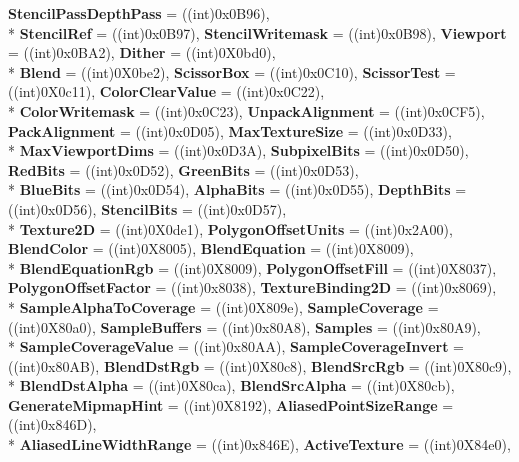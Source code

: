 \begin{DoxyCompactItemize}
{\bfseries Stencil\-Pass\-Depth\-Pass} = ((int)0x0\-B96), 
\\*
{\bfseries Stencil\-Ref} = ((int)0x0\-B97), 
{\bfseries Stencil\-Writemask} = ((int)0x0\-B98), 
{\bfseries Viewport} = ((int)0x0\-B\-A2), 
{\bfseries Dither} = ((int)0\-X0bd0), 
\\*
{\bfseries Blend} = ((int)0\-X0be2), 
{\bfseries Scissor\-Box} = ((int)0x0\-C10), 
{\bfseries Scissor\-Test} = ((int)0\-X0c11), 
{\bfseries Color\-Clear\-Value} = ((int)0x0\-C22), 
\\*
{\bfseries Color\-Writemask} = ((int)0x0\-C23), 
{\bfseries Unpack\-Alignment} = ((int)0x0\-C\-F5), 
{\bfseries Pack\-Alignment} = ((int)0x0\-D05), 
{\bfseries Max\-Texture\-Size} = ((int)0x0\-D33), 
\\*
{\bfseries Max\-Viewport\-Dims} = ((int)0x0\-D3\-A), 
{\bfseries Subpixel\-Bits} = ((int)0x0\-D50), 
{\bfseries Red\-Bits} = ((int)0x0\-D52), 
{\bfseries Green\-Bits} = ((int)0x0\-D53), 
\\*
{\bfseries Blue\-Bits} = ((int)0x0\-D54), 
{\bfseries Alpha\-Bits} = ((int)0x0\-D55), 
{\bfseries Depth\-Bits} = ((int)0x0\-D56), 
{\bfseries Stencil\-Bits} = ((int)0x0\-D57), 
\\*
{\bfseries Texture2\-D} = ((int)0\-X0de1), 
{\bfseries Polygon\-Offset\-Units} = ((int)0x2\-A00), 
{\bfseries Blend\-Color} = ((int)0\-X8005), 
{\bfseries Blend\-Equation} = ((int)0\-X8009), 
\\*
{\bfseries Blend\-Equation\-Rgb} = ((int)0\-X8009), 
{\bfseries Polygon\-Offset\-Fill} = ((int)0\-X8037), 
{\bfseries Polygon\-Offset\-Factor} = ((int)0x8038), 
{\bfseries Texture\-Binding2\-D} = ((int)0x8069), 
\\*
{\bfseries Sample\-Alpha\-To\-Coverage} = ((int)0\-X809e), 
{\bfseries Sample\-Coverage} = ((int)0\-X80a0), 
{\bfseries Sample\-Buffers} = ((int)0x80\-A8), 
{\bfseries Samples} = ((int)0x80\-A9), 
\\*
{\bfseries Sample\-Coverage\-Value} = ((int)0x80\-A\-A), 
{\bfseries Sample\-Coverage\-Invert} = ((int)0x80\-A\-B), 
{\bfseries Blend\-Dst\-Rgb} = ((int)0\-X80c8), 
{\bfseries Blend\-Src\-Rgb} = ((int)0\-X80c9), 
\\*
{\bfseries Blend\-Dst\-Alpha} = ((int)0\-X80ca), 
{\bfseries Blend\-Src\-Alpha} = ((int)0\-X80cb), 
{\bfseries Generate\-Mipmap\-Hint} = ((int)0\-X8192), 
{\bfseries Aliased\-Point\-Size\-Range} = ((int)0x846\-D), 
\\*
{\bfseries Aliased\-Line\-Width\-Range} = ((int)0x846\-E), 
{\bfseries Active\-Texture} = ((int)0\-X84e0), 

\end{DoxyCompactItemize}
